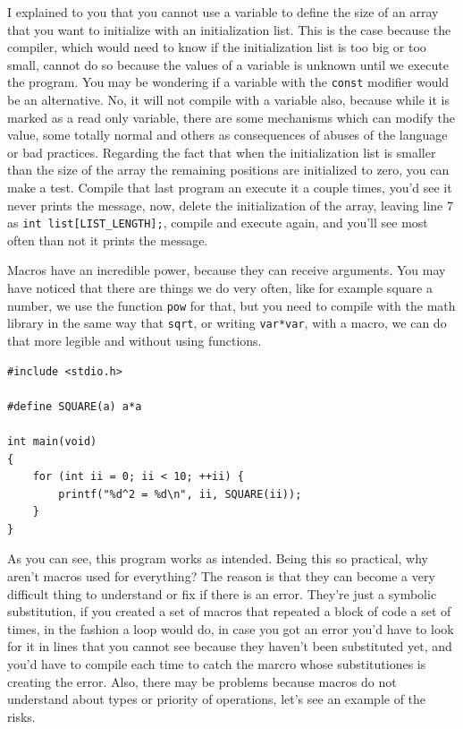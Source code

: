 \documentclass[a4paper]{article}
\begin{document}
I explained to you that you cannot use a variable to define the size of an array
that you want to initialize with an initialization list. This is the case
because the compiler, which would need to know if the initialization list is too
big or too small, cannot do so because the values of a variable is unknown
until we execute the program. You may be wondering if a variable with the
\verb!const! modifier would be an alternative. No, it will not compile with a
variable also, because while it is marked as a read only variable, there are
some mechanisms which can modify the value, some totally normal and others as
consequences of abuses of the language or bad practices. Regarding the fact
that when the initialization list is smaller than the size of the array the
remaining positions are initialized to zero, you can make a test. Compile that
last program an execute it a couple times, you'd see it never prints the
message, now, delete the initialization of the array, leaving line 7 as
\verb!int list[LIST_LENGTH];!, compile and execute again, and you'll see most
often than not it prints the message.

Macros have an incredible power, because they can receive arguments. You may
have noticed that there are things we do very often, like for example square a
number, we use the function \verb!pow! for that, but you need to compile with
the math library in the same way that \verb!sqrt!, or writing \verb!var*var!,
with a macro, we can do that more legible and without using functions.

\noindent
\begin{minipage}[H]{\linewidth}
\mbox{}
\begin{lstlisting}[style=C,
caption={Macro with arguments},
label={lst:macroWithArguments}]
#include <stdio.h>

#define SQUARE(a) a*a

int main(void)
{
    for (int ii = 0; ii < 10; ++ii) {
        printf("%d^2 = %d\n", ii, SQUARE(ii));
    }
}
\end{lstlisting}
\end{minipage}

As you can see, this program works as intended. Being this so practical, why
aren't macros used for everything? The reason is that they can become a very
difficult thing to understand or fix if there is an error. They're just a
symbolic substitution, if you created a set of macros that repeated a block of
code a set of times, in the fashion a loop would do, in case you got an error
you'd have to look for it in lines that you cannot see because they haven't been
substituted yet, and you'd have to compile each time to catch the marcro whose
substitutiones is creating the error. Also, there may be problems because macros
do not understand about types or priority of operations, let's see an example of
the risks.
\end{document}
